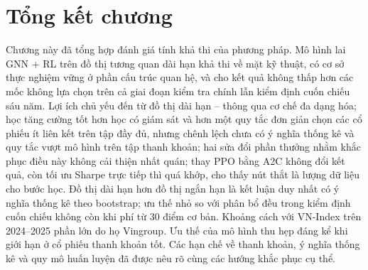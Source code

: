 \section{Tổng kết chương}
Chương này đã tổng hợp đánh giá tính khả thi của phương pháp. Mô hình lai GNN + RL trên đồ thị tương quan dài hạn khả thi về mặt kỹ thuật, có cơ sở thực nghiệm vững ở phần cấu trúc quan hệ, và cho kết quả không thấp hơn các mốc không lựa chọn trên cả giai đoạn kiểm tra chính lẫn kiểm định cuốn chiếu sáu năm. Lợi ích chủ yếu đến từ đồ thị dài hạn -- thông qua cơ chế đa dạng hóa; học tăng cường tốt hơn học có giám sát và hơn một quy tắc đơn giản chọn các cổ phiếu ít liên kết trên tập đầy đủ, nhưng chênh lệch chưa có ý nghĩa thống kê và quy tắc vượt mô hình trên tập thanh khoản; hai sửa đổi phần thưởng nhằm khắc phục điều này không cải thiện nhất quán; thay PPO bằng A2C không đổi kết quả, còn tối ưu Sharpe trực tiếp thì quá khớp, cho thấy nút thắt là lượng dữ liệu cho bước học. Đồ thị dài hạn hơn đồ thị ngắn hạn là kết luận duy nhất có ý nghĩa thống kê theo bootstrap; ưu thế nhỏ so với phân bổ đều trong kiểm định cuốn chiếu không còn khi phí từ 30 điểm cơ bản. Khoảng cách với VN-Index trên 2024--2025 phần lớn do họ Vingroup. Ưu thế của mô hình thu hẹp đáng kể khi giới hạn ở cổ phiếu thanh khoản tốt. Các hạn chế về thanh khoản, ý nghĩa thống kê và quy mô huấn luyện đã được nêu rõ cùng các hướng khắc phục cụ thể.
